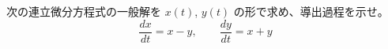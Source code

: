 
次の連立微分方程式の一般解を $x(t)$, $y(t)$ の形で求め、導出過程を示せ。
\[
\frac{dx}{dt} = x - y, \qquad \frac{dy}{dt} = x + y
\]
